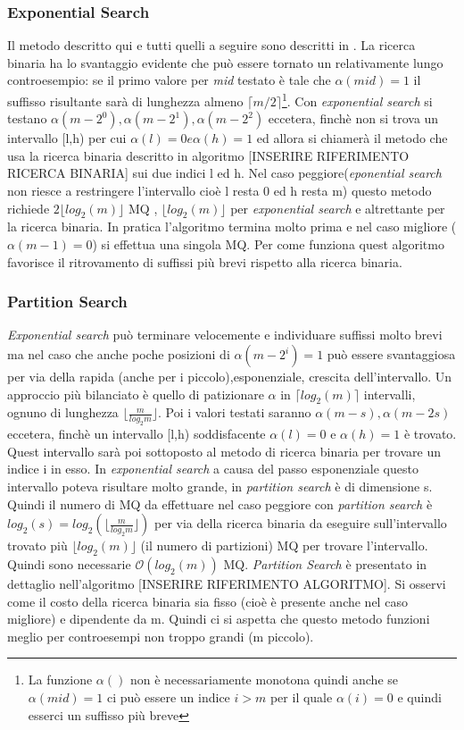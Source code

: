 \subsubsection{Exponential Search}
 Il metodo descritto qui e tutti quelli a seguire sono descritti in \cite{StefCounterexample14}.  La ricerca binaria ha lo svantaggio evidente che può essere tornato un relativamente lungo controesempio: se il primo valore per \textit{mid} testato è tale che $\alpha(mid)=1$ il suffisso risultante sarà di lunghezza almeno   $\lceil m/2 \rceil$\footnote{La funzione $\alpha()$ non è necessariamente monotona quindi anche se $\alpha(mid)=1$ ci può essere un indice $i>m$ per il quale $\alpha(i)=0$ e quindi esserci un suffisso più breve}. Con \textit{exponential search}  si testano $\alpha(m-2^{0}),\alpha(m-2^{1}),\alpha(m-2^{2})$ eccetera, finchè non si trova un intervallo [l,h) per cui $\alpha(l)=0 e \alpha(h)=1$ ed allora si chiamerà il metodo che usa la ricerca binaria descritto in algoritmo [INSERIRE RIFERIMENTO RICERCA BINARIA] sui due indici l ed h. Nel caso peggiore(\textit{eponential search} non riesce a restringere l'intervallo cioè l resta 0 ed h resta m) questo metodo richiede $2\lfloor log_{2}(m) \rfloor$ \ac{MQ} , $\lfloor log_{2}(m)\rfloor$ per \textit{exponential search} e altrettante per la ricerca binaria. In pratica l'algoritmo termina molto prima e nel caso migliore ($\alpha(m-1)=0$) si effettua una singola \ac{MQ}. Per come funziona quest algoritmo favorisce il ritrovamento di suffissi più brevi rispetto alla ricerca binaria.
 
 \subsubsection{Partition Search}
\textit{Exponential search} può terminare velocemente e individuare suffissi molto brevi ma nel caso che  anche poche posizioni di $\alpha(m-2^{i}) = 1$ può essere svantaggiosa per via della rapida (anche per i piccolo),esponenziale, crescita dell'intervallo. Un approccio più bilanciato è quello di patizionare $\alpha$ in $\lceil log_{2}(m)\rceil$ intervalli, ognuno di lunghezza $\lfloor  \frac{m}{log_{2}m} \rfloor$. Poi i valori testati saranno $\alpha(m-s), \alpha(m-2s)$ eccetera, finchè un intervallo [l,h) soddisfacente $\alpha(l)=0 \text{ e } \alpha(h)=1$ è trovato. Quest intervallo sarà poi sottoposto al metodo di ricerca binaria per trovare un indice i in esso. In \textit{exponential search} a causa del passo esponenziale questo intervallo poteva risultare molto grande, in \textit{partition search} è di dimensione s. Quindi il numero di \ac{MQ} da effettuare nel caso peggiore con  \textit{partition search} è $log_{2}(s) = log_{2}(\lfloor  \frac{m}{log_{2}m} \rfloor)$ per via della ricerca binaria da eseguire sull'intervallo trovato più $\lfloor log_{2}(m)\rfloor$ (il numero di partizioni) \ac{MQ} per trovare l'intervallo. Quindi sono necessarie $\mathcal{O}(log_{2}(m))$ \ac{MQ}. \textit{Partition Search} è presentato in dettaglio nell'algoritmo [INSERIRE RIFERIMENTO ALGORITMO]. Si osservi come il costo della ricerca binaria sia fisso (cioè è presente anche nel caso migliore) e dipendente da m. Quindi ci si aspetta che questo metodo funzioni meglio per controesempi non troppo grandi (m piccolo).

